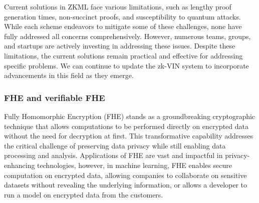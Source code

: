 \documentclass[conference]{IEEEtran}
\begin{document}
Current solutions in ZKML face various limitations, such as lengthy proof generation times, non-succinct proofs, and susceptibility to quantum attacks. While each scheme endeavors to mitigate some of these challenges, none have fully addressed all concerns comprehensively. However, numerous teams, groups, and startups are actively investing in addressing these issues. Despite these limitations, the current solutions remain practical and effective for addressing specific problems. We can continue to update the zk-VIN system to incorporate advancements in this field as they emerge.

\subsubsection{FHE and verifiable FHE}

Fully Homomorphic Encryption (FHE) stands as a groundbreaking cryptographic technique that allows computations to be performed directly on encrypted data without the need for decryption at first. This transformative capability addresses the critical challenge of preserving data privacy while still enabling data processing and analysis. Applications of FHE are vast and impactful in privacy-enhancing technologies, however, in machine learning, FHE enables secure computation on encrypted data, allowing companies to collaborate on sensitive datasets without revealing the underlying information, or allows a developer to run a model on encrypted data from the customers.
\end{document}
